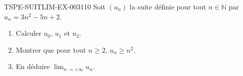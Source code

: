 \begin{exercice}{TSPE-SUITLIM-EX-003}{1}{10}
Soit $(u_n)$ la suite définie pour tout $n \in \mathbb{N}$ par $u_n = 3n^2 - 5n + 2$.
\begin{enumerate}
  \item Calculer $u_0$, $u_1$ et $u_2$.
  \item Montrer que pour tout $n \geq 2$, $u_n \geq n^2$.
  \item En déduire $\lim_{n \to +\infty} u_n$.
\end{enumerate}
\end{exercice}
